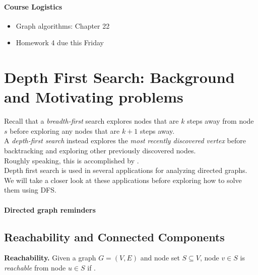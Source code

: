 \documentclass[11  pt]{exam}
\begin{document}
	
	
	
	\paragraph{Course Logistics}
	
	\begin{itemize}
		\item Graph algorithms: Chapter 22
		\item Homework 4 due this Friday
	\end{itemize}

	
	\section{Depth First Search: Background and Motivating problems}
	Recall that a \emph{breadth-first} search explores nodes that are $k$ steps away from node $s$ before exploring any nodes that are $k+1$ steps away. \\
	
	A \emph{depth-first search} instead explores the \emph{most recently discovered vertex} before backtracking and exploring other previously discovered nodes.\\
	
	Roughly speaking, this is accomplished by . \\
	
	Depth first search is used in several applications for analyzing directed graphs. We will take a closer look at these applications before exploring how to solve them using DFS. \\
	
	\paragraph{Directed graph reminders}
	
	
	\newpage
	
	\subsection{Reachability and Connected Components}
	\textbf{Reachability.} Given a graph $G = (V,E)$ and node set $S \subseteq V$, node $v \in S$ is \emph{reachable} from node $u \in S$ if . \\
	\vfill
	
\end{document}
